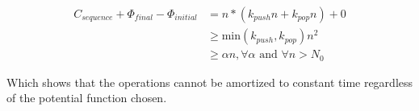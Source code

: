 \[
\begin{array}{rl}
  C_{sequence} + \Phi_{final} - \Phi_{initial} & = n * (k_{push}n + k_{pop}n) + 0 \\
   & \geq \text{min}(k_{push}, k_{pop}) n^2 \\
   & \geq \alpha n, \forall \alpha \text{ and } \forall n > N_0
\end{array}
\]

Which shows that the operations cannot be amortized to constant time regardless of the potential function chosen.
